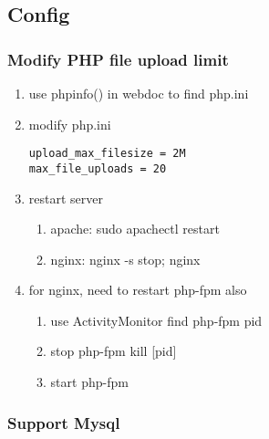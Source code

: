     
    \subsection{Config}
        \subsubsection{Modify PHP file upload limit}
            \begin{enumerate}
                \item use \colorbox{gray!30}{phpinfo()} in webdoc to find php.ini
                \item modify php.ini
\begin{lstlisting}
upload_max_filesize = 2M
max_file_uploads = 20            
\end{lstlisting}
                \item restart server 
                    \begin{enumerate}
                        \item apache: \colorbox{gray!30}{sudo apachectl restart}
                        \item nginx: \colorbox{gray!30}{nginx -s stop; nginx}
                    \end{enumerate}
                \item for nginx, need to restart php-fpm also
                    \begin{enumerate}
                        \item use ActivityMonitor find php-fpm pid
                        \item stop php-fpm \colorbox{gray!30}{kill [pid]}
                        \item start \colorbox{gray!30}{php-fpm}
                    \end{enumerate}
            \end{enumerate}
            
        \subsubsection{Support Mysql}
        
        
